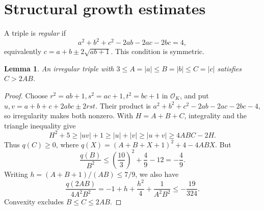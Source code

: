 \documentclass[12pt]{article}
\newtheorem{lemma}[theorem]{Lemma}
\numberwithin{equation}{section}
\begin{document}
\section{Structural growth estimates}\label{sec:structural-growth}

A triple is \emph{regular} if
\[
 a^2+b^2+c^2-2ab-2ac-2bc=4,
\]
equivalently \(c=a+b\pm2\sqrt{ab+1}\). This condition is symmetric.

\begin{lemma}\label{lem:irregular-growth}
An irregular triple with \(3\le A=|a|\le B=|b|\le C=|c|\) satisfies
\(C>2AB\).
\end{lemma}
\begin{proof}
Choose \(r^2=ab+1,s^2=ac+1,t^2=bc+1\) in \(\mathcal O_K\), and put
\(u,v=a+b+c+2abc\pm2rst\). Their product is
\(a^2+b^2+c^2-2ab-2ac-2bc-4\), so irregularity makes both nonzero.
With \(H=A+B+C\), integrality and the triangle inequality give
\[
 H^2+5\ge |uv|+1\ge |u|+|v|\ge|u+v|\ge4ABC-2H.
\]
Thus \(q(C)\ge0\), where \(q(X)=(A+B+X+1)^2+4-4ABX\).
But
\[
 \frac{q(B)}{B^2}\le\left(\frac{10}{3}\right)^2+\frac49-12=-\frac49.
\]
Writing \(h=(A+B+1)/(AB)\le7/9\), we also have
\[
 \frac{q(2AB)}{4A^2B^2}
 =-1+h+\frac{h^2}{4}+\frac1{A^2B^2}\le-\frac{19}{324}.
\]
Convexity excludes \(B\le C\le2AB\).
\end{proof}
\end{document}
